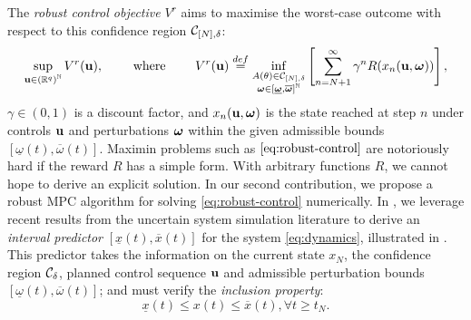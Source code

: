 \documentclass{article}
\begin{document}
The \emph{robust control objective} $V^r$ \citep{Bental2009,Bertsimas2011,Gorissen2015} aims to maximise the worst-case outcome with respect to this confidence region $\mathcal{C}_{[N],\delta}$:
\begin{equation}
\label{eq:robust-control}
\sup_{\mathbf{u}\in{(\mathbb{R}^q)}^{\mathbb{N}}} {V^r(\mathbf{u})}, \qquad \text{ where }\qquad {V^r(\mathbf{u})} \stackrel{def}{=} \inf_{\substack{A(\theta) \in \mathcal{C}_{[N],\delta} \\ \bm{\omega}\in[\underline{\bm{\omega}},\overline{\bm{\omega}}]^{\mathbb{N}}}} \left[\sum_{n=N+1}^\infty \gamma^n R(x_n(\mathbf{u},\bm{\omega}))\right],
\end{equation}
$\gamma\in(0,1)$ is a discount factor, and $x_n(\mathbf{u},\bm{\omega})$ is the state reached at step $n$ under controls $\mathbf{u}$ and perturbations $\bm{\omega}$ within the given admissible bounds $[\underline\omega(t),\overline\omega(t)]$. Maximin problems such as $\eqref{eq:robust-control}$ are notoriously hard if the reward $R$ has a simple form. With arbitrary functions $R$, we cannot hope to derive an explicit solution.
In our second contribution, we propose a robust MPC algorithm for solving \eqref{eq:robust-control} numerically. In , we leverage recent results from the uncertain system simulation literature to derive an \emph{interval predictor} $[\underline{x}(t),\overline{x}(t)]$ for the system \eqref{eq:dynamics}, illustrated in . This predictor takes the information on the current state ${x}_N$, the confidence region $\mathcal{C}_\delta$, planned control sequence $\mathbf{u}$ and admissible perturbation bounds $[\underline{\omega}(t),\overline{\omega}(t)]$; and must verify the \emph{inclusion property}:
\begin{equation}
\label{eq:inclusion-property}
\underline{x}(t)\leq x(t)\leq\overline{x}(t), \forall t\geq t_N.
\end{equation}
\end{document}
